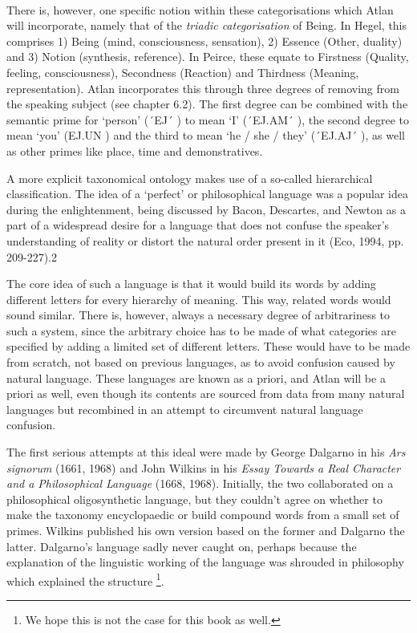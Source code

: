 \phantom{.}\\

There is, however, one specific notion within these categorisations which Atlan will incorporate, namely that of the {\it triadic categorisation} of Being. In Hegel, this comprises 1) Being (mind, consciousness, sensation), 2) Essence (Other, duality) and 3) Notion (synthesis, reference). In Peirce, these equate to Firstness (Quality, feeling, consciousness), Secondness (Reaction) and Thirdness (Meaning, representation). Atlan incorporates this through three degrees of removing from the speaking subject (see chapter 6.2). The first degree can be combined with the semantic prime for ‘person’ (´EJ´ \ej) to mean ‘I’ (´EJ.AM´ \ej \am), the second degree to mean ‘you’ (EJ.UN \ej \un) and the third to mean ‘he / she / they’ (´EJ.AJ´ \ej \aj), as well as other primes like place, time and demonstratives. 

A more explicit taxonomical ontology makes use of a so-called hierarchical classification. The idea of a ‘perfect’ or philosophical language was a popular idea during the enlightenment, being discussed by Bacon, Descartes, and Newton as a part of a widespread desire for a language that does not confuse the speaker’s understanding of reality or distort the natural order present in it (Eco, 1994, pp. 209-227).2 

The core idea of such a language is that it would build its words by adding different letters for every hierarchy of meaning. This way, related words would sound similar. There is, however, always a necessary degree of arbitrariness to such a system, since the arbitrary choice has to be made of what categories are specified by adding a limited set of different letters. These would have to be made from scratch, not based on previous languages, as to avoid confusion caused by natural language. These languages are known as a priori, and Atlan will be a priori as well, even though its contents are sourced from data from many natural languages but recombined in an attempt to circumvent natural language confusion.  

The first serious attempts at this ideal were made by George Dalgarno in his {\it Ars signorum} (1661, 1968) and John Wilkins in his \textit{Essay Towards a Real Character and a Philosophical Language} (1668, 1968). Initially, the two collaborated on a philosophical oligosynthetic language, but they couldn’t agree on whether to make the taxonomy encyclopaedic or build compound words from a small set of primes. Wilkins published his own version based on the former and Dalgarno the latter. Dalgarno’s language sadly never caught on, perhaps because the explanation of the linguistic working of the language was shrouded in philosophy which explained the structure \footnote{We hope this is not the case for this book as well.}. 

